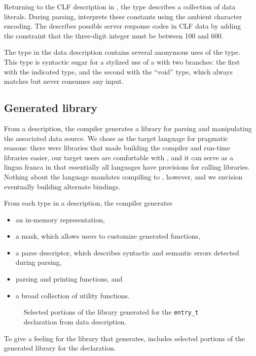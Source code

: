 Returning to the CLF description in , the
 type  describes a collection of data literals.
During parsing, \pads{} interprets these constants using the ambient
character encoding.  The   describes
possible server response codes in CLF data by adding the constraint
that the three-digit integer must be between 100 and 600.

The  type in the \dibbler{} data description
contains several anonymous uses of the  type.  This type is
syntactic sugar for a stylized use of a  with two branches:
the first with the indicated type, and the second with the ``void''
type, which always matches but never consumes any input.



\subsection{Generated library}
\label{sec:example:generated-library}
From a description, the \pads{} compiler generates a \C{} library
for parsing and manipulating the associated data source.  We chose \C{}
as the target language for pragmatic reasons: there were 
libraries that made building the compiler and run-time libraries easier,
our target users are comfortable with \C{}, and it can serve 
as a lingua franca in that essentially all languages have provisions for 
calling \C{} libraries.  Nothing about the \pads{} language mandates compiling
to \C{}, however, and we envision eventually building alternate bindings.

From each type in a \pads{} description, the compiler generates 
\begin{itemize}
\setlength{\itemsep}{0ex plus0.2ex}
\item an in-memory representation, 
\item a mask, which allows users to customize generated functions,
\item a parse descriptor, which describes syntactic and
semantic errors detected during parsing, 
\item parsing and printing functions, and 
\item a broad collection of utility functions.
\end{itemize}
%
\setcounter{totalnumber}{1}
\setcounter{dbltopnumber}{1}
\renewcommand{\topfraction}{0.85}
\renewcommand{\textfraction}{0.1}
\renewcommand{\floatpagefraction}{0.75}
\begin{figure*}
\begin{tiny}

\caption{Selected portions of the library generated for the \texttt{entry\_t}
  declaration from \dibbler{} data description.}
\label{figure:library}
\end{tiny}
\end{figure*}
To give a feeling for the library that \pads{} generates, 
 includes selected portions of the generated 
library for the \dibbler{}  declaration.

